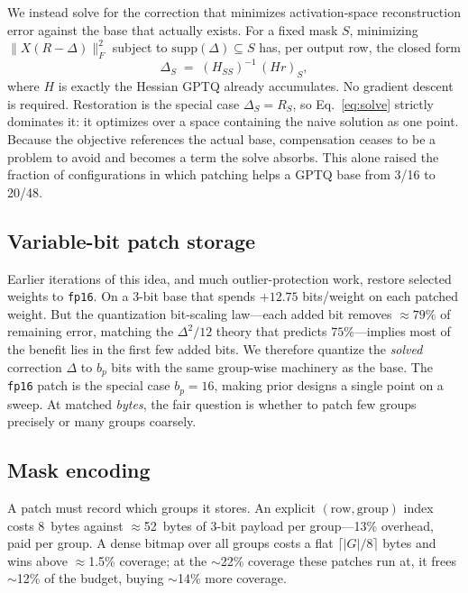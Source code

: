 \documentclass[manuscript, screen, review]{jair}
\newcommand{\bpw}{bits/weight}
\newcommand{\code}[1]{\texttt{#1}}
\begin{document}
We instead solve for the correction that minimizes activation-space
reconstruction error against the base that actually exists. For a fixed mask
$S$, minimizing $\lVert X(R - \Delta)\rVert_F^2$ subject to
$\mathrm{supp}(\Delta)\subseteq S$ has, per output row, the closed form
\begin{equation}
  \Delta_S \;=\; (H_{SS})^{-1}\,(Hr)_S ,
  \label{eq:solve}
\end{equation}
where $H$ is exactly the Hessian GPTQ already accumulates. No gradient descent
is required. Restoration is the special case $\Delta_S = R_S$, so
Eq.~\eqref{eq:solve} strictly dominates it: it optimizes over a space
containing the naive solution as one point. Because the objective references
the actual base, compensation ceases to be a problem to avoid and becomes a
term the solve absorbs. This alone raised the fraction of configurations in
which patching helps a GPTQ base from 3/16 to 20/48.

\subsection{Variable-bit patch storage}
\label{sec:varbit}
Earlier iterations of this idea, and much outlier-protection work, restore
selected weights to \code{fp16}. On a 3-bit base that spends $+12.75$
\bpw{} on each patched weight. But the quantization bit-scaling law---each
added bit removes $\approx 79\%$ of remaining error, matching the
$\Delta^2/12$ theory that predicts $75\%$---implies most of the benefit lies in
the first few added bits. We therefore quantize the \emph{solved} correction
$\Delta$ to $b_p$ bits with the same group-wise machinery as the base. The
\code{fp16} patch is the special case $b_p{=}16$, making prior designs a
single point on a sweep. At matched \emph{bytes}, the fair question is whether
to patch few groups precisely or many groups coarsely.

\subsection{Mask encoding}
A patch must record which groups it stores. An explicit $(\text{row},
\text{group})$ index costs 8~bytes against $\approx$52~bytes of 3-bit payload
per group---13\% overhead, paid per group. A dense bitmap over all groups costs
a flat $\lceil |G|/8\rceil$ bytes and wins above $\approx$1.5\% coverage; at the
$\sim$22\% coverage these patches run at, it frees $\sim$12\% of the budget,
buying $\sim$14\% more coverage.
\end{document}

